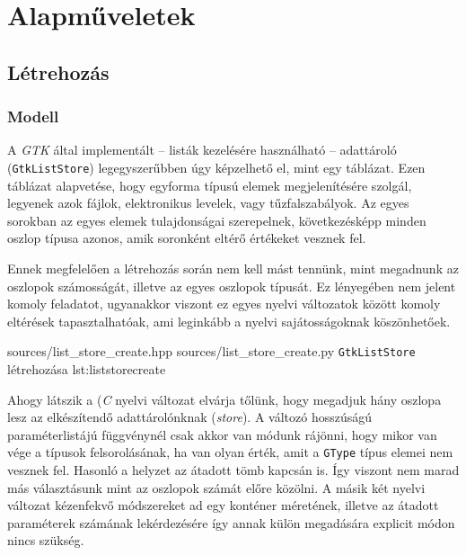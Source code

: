 \section{Alapműveletek}

\subsection{Létrehozás}

\subsubsection{Modell}

A \textit{GTK} által implementált -- listák kezelésére használható -- adattároló (\texttt{GtkListStore}) legegyszerűbben úgy képzelhető el, mint egy táblázat. Ezen táblázat alapvetése, hogy egyforma típusú elemek megjelenítésére szolgál, legyenek azok fájlok, elektronikus levelek, vagy tűzfalszabályok. Az egyes sorokban az egyes elemek tulajdonságai szerepelnek, következésképp minden oszlop típusa azonos, amik soronként eltérő értékeket vesznek fel.

Ennek megfelelően a létrehozás során nem kell mást tennünk, mint megadnunk az oszlopok számosságát, illetve az egyes oszlopok típusát. Ez lényegében nem jelent komoly feladatot, ugyanakkor viszont ez egyes nyelvi változatok között komoly eltérések tapasztalhatóak, ami leginkább a nyelvi sajátosságoknak köszönhetőek.

{sources/list_store_create.hpp}
{sources/list_store_create.py}
{\texttt{GtkListStore} létrehozása}
{lst:liststorecreate}

Ahogy látszik a (\textit{C} nyelvi változat elvárja tőlünk, hogy megadjuk hány oszlopa lesz az elkészítendő adattárolónknak (\textit{store}). A változó hosszúságú paraméterlistájú függvénynél csak akkor van módunk rájönni, hogy mikor van vége a típusok felsorolásának, ha van olyan érték, amit a \texttt{GType} típus elemei nem vesznek fel. Hasonló a helyzet az átadott tömb kapcsán is. Így viszont nem marad más választásunk mint az oszlopok számát előre közölni. A másik két nyelvi változat kézenfekvő módszereket ad egy konténer méretének, illetve az átadott paraméterek számának lekérdezésére így annak külön megadására explicit módon nincs szükség.

